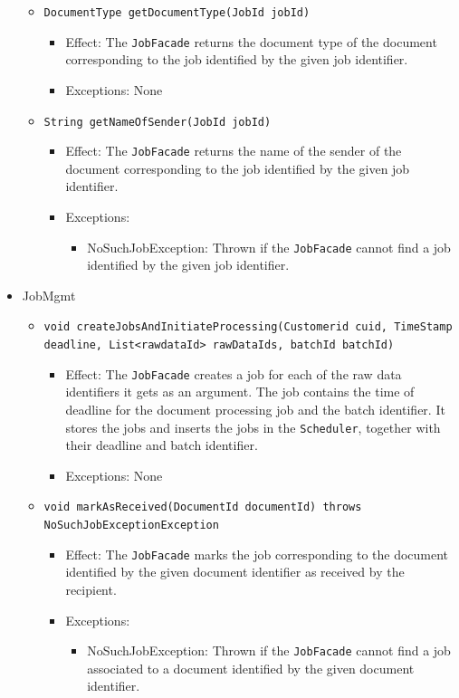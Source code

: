 \documentclass[a4paper,10pt]{article}
\begin{document}
\begin{itemize}
\begin{itemize}
         \item \texttt{DocumentType getDocumentType(JobId jobId)}
        \begin{itemize}
            \item Effect: The \texttt{JobFacade} returns the document type of the document corresponding to the job identified by the given job identifier.
            \item Exceptions: None
        \end{itemize}
        
        \item \texttt{String getNameOfSender(JobId jobId)}    
        \begin{itemize}
            \item Effect: The \texttt{JobFacade} returns the name of the sender of the document corresponding to the job identified by the given job identifier.
            \item Exceptions:
            \begin{itemize}
            	\item NoSuchJobException: Thrown if the \texttt{JobFacade} cannot find a job identified by the given job identifier.
            \end{itemize}
        \end{itemize}        
        
        
    \end{itemize}  
    
    \item JobMgmt
    \begin{itemize}
    	\item \texttt{void createJobsAndInitiateProcessing(Customerid cuid, TimeStamp deadline, List<rawdataId> rawDataIds, batchId batchId)}
    	\begin{itemize}
            \item Effect: The \texttt{JobFacade} creates a job for each of the raw data identifiers it gets as an argument. The job contains the time of deadline for the document processing job and the batch identifier. It stores the jobs and inserts the jobs in the \texttt{Scheduler}, together with their deadline and batch identifier.
            \item Exceptions: None
        \end{itemize}
    	
    	\item \texttt{void markAsReceived(DocumentId documentId) throws NoSuchJobExceptionException}
    	\begin{itemize}
    		\item Effect: The \texttt{JobFacade} marks the job corresponding to the document identified by the given document identifier as received by the recipient.
    		\item Exceptions:
    		\begin{itemize}
    			\item NoSuchJobException: Thrown if the \texttt{JobFacade} cannot find a job associated to a document identified by the given document identifier.
    		\end{itemize}
    	\end{itemize}
    	

\end{itemize}
\end{itemize}
\end{document}
